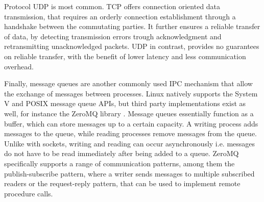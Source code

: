 Protocol \ac{UDP} is most common. TCP offers connection oriented data transmission, that requires an orderly connection establishment through a handshake between the commutating parties. It further ensures a reliable transfer of data, by       
detecting transmission errors trough acknowledgment and retransmitting unacknowledged packets. \ac{UDP} in contrast, provides no guarantees on reliable transfer, with the benefit of lower latency and less communication overhead. \cite[p.29ff.]{stevens1998sock}
\par
{}
Finally, message queues are another commonly used \ac{IPC} mechanism that allow the exchange of messages between processes. Linux natively supports the System V \cite{systemvshm} and POSIX \cite{posixmsq} message queue APIs, but third party
implementations exist as well, for instance the ZeroMQ library \cite{zeromq}. Message queues essentially function as a buffer, which can store messages up to a certain capacity. A writing process adds messages to the queue, while
reading processes remove messages from the queue. Unlike with sockets, writing and reading can occur asynchronously i.e. messages do not have to be read immediately after being added to a queue. ZeroMQ specifically supports a range of communication 
patterns, among them the publish-subscribe pattern, where a writer sends messages to multiple subscribed readers or the request-reply pattern, that can be used to implement remote procedure calls.         

